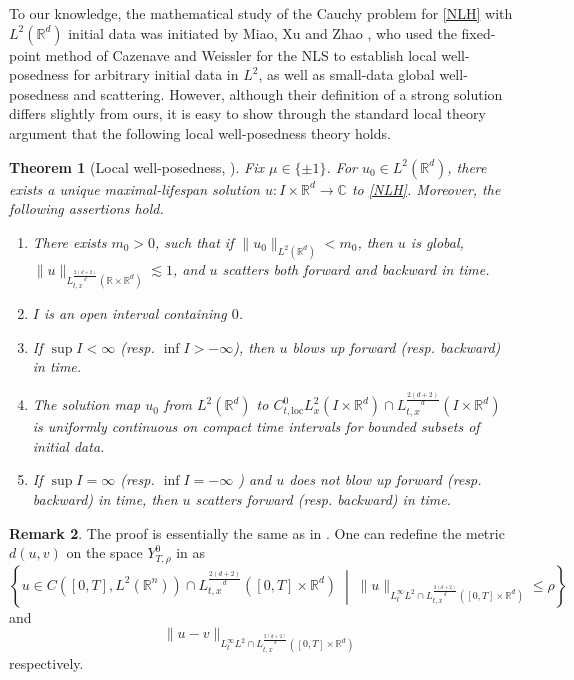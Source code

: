\documentclass[reqno,11pt]{amsart}
\theoremstyle{plain}
\newtheorem{theorem}{Theorem}
\theoremstyle{definition}
\newtheorem{remark}[theorem]{Remark}
\numberwithin{equation}{section}
\numberwithin{theorem}{section}
\def\leq{\leqslant}
\def\R{\mathbb{R}}
\begin{document}
To our knowledge, the mathematical study of the Cauchy problem for \eqref{NLH} with $L^2(\mathbb{R}^d)$  initial data was initiated by Miao, Xu and Zhao \cite{MXZ-JPDE}, who used the fixed-point method of Cazenave and Weissler \cite{Cazenave} for the NLS to establish local well-posedness for arbitrary initial data in $L^2$, as well as small-data global well-posedness and scattering. However, although their definition of a strong solution differs slightly from ours, it is easy to show through the standard local theory argument that the following local well-posedness theory holds.
\begin{theorem}[Local well-posedness, \cite{MXZ-JPDE}] \label{thm:local-well-posedness}
Fix  $\mu \in \{ \pm 1 \}$. For $u_0 \in L^2(\mathbb{R}^d)$, there exists a unique maximal-lifespan solution  $u : I \times \mathbb{R}^d \to \mathbb{C}$ to \eqref{NLH}. Moreover, the following assertions hold.
\begin{enumerate}
    \item There exists  $m_0>0$, such that if  $\|u_0\|_{L^2(\mathbb{R}^d)} < m_0$, then $u$ is global, \( \|u\|_{L_{t,x}^{\frac{2(d+2)}{d}}(\mathbb{R} \times \mathbb{R}^d)} \lesssim 1 \), and $u$ scatters both forward and backward in time.
    
    \item $I$ is an open interval containing $0$.
    
    \item If $\sup I < \infty$ (resp. $\inf I > -\infty$), then $u$ blows up forward (resp. backward) in time.
    
    \item The solution map $u_0$ from  $L^2(\mathbb{R}^d)$  to  $C_{t,\text{loc}}^0 L_x^2(I \times \mathbb{R}^d) \cap L_{t,x}^{\frac{2(d+2)}{d}}(I \times \mathbb{R}^d)$ is uniformly continuous on compact time intervals for bounded subsets of initial data.
    
    \item If $\sup I = \infty$ (resp. $\inf I = -\infty$ ) and $u$ does not blow up forward (resp. backward) in time, then $u$ scatters forward (resp. backward) in time.
\end{enumerate}
\end{theorem}
\begin{remark}
    The proof is essentially the same as in \cite{MXZ-JPDE}. One can redefine the metric  $d(u,v)$ on the space $Y_{T,\rho}^0$ in \cite[Theorem 3.1]{MXZ-JPDE} as 
   \[
   \left\{ u \in C([0,T],L^2(\mathbb{R}^n)) \cap L_{t,x}^{\frac{2(d+2)}{d}}([0,T]\times\mathbb{R}^d) \; \middle| \; \|u\|_{L_t^\infty L^2\cap L_{t,x}^{\frac{2(d+2)}{d}}([0,T]\times\R^d)} \leq \rho \right\}
   \]
   and
   \[
   \|u-v\|_{L_t^\infty L^2\cap L_{t,x}^{\frac{2(d+2)}{d}}([0,T]\times\R^d)}
   \]
   respectively. 
\end{remark}
\end{document}
